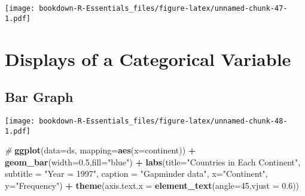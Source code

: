 \documentclass[]{book}
\newenvironment{Shaded}{\begin{snugshade}}{\end{snugshade}}
\newcommand{\KeywordTok}[1]{\textcolor[rgb]{0.13,0.29,0.53}{\textbf{#1}}}
\newcommand{\DataTypeTok}[1]{\textcolor[rgb]{0.13,0.29,0.53}{#1}}
\newcommand{\DecValTok}[1]{\textcolor[rgb]{0.00,0.00,0.81}{#1}}
\newcommand{\FloatTok}[1]{\textcolor[rgb]{0.00,0.00,0.81}{#1}}
\newcommand{\StringTok}[1]{\textcolor[rgb]{0.31,0.60,0.02}{#1}}
\newcommand{\CommentTok}[1]{\textcolor[rgb]{0.56,0.35,0.01}{\textit{#1}}}
\newcommand{\OperatorTok}[1]{\textcolor[rgb]{0.81,0.36,0.00}{\textbf{#1}}}
\newcommand{\NormalTok}[1]{#1}
\begin{document}
\texttt{[image: bookdown-R-Essentials\_files/figure-latex/unnamed-chunk-47-1.pdf]}

\section{Displays of a Categorical
Variable}\label{displays-of-a-categorical-variable}

\subsection{Bar Graph}\label{bar-graph}

\begin{Shaded}
\end{Shaded}

\texttt{[image: bookdown-R-Essentials\_files/figure-latex/unnamed-chunk-48-1.pdf]}

\begin{Shaded}
\begin{Highlighting}[]
\CommentTok{#}
\KeywordTok{ggplot}\NormalTok{(}\DataTypeTok{data=}\NormalTok{ds, }\DataTypeTok{mapping=}\KeywordTok{aes}\NormalTok{(}\DataTypeTok{x=}\NormalTok{continent)) }\OperatorTok{+}\StringTok{ }
\StringTok{  }\KeywordTok{geom_bar}\NormalTok{(}\DataTypeTok{width=}\FloatTok{0.5}\NormalTok{,}\DataTypeTok{fill=}\StringTok{"blue"}\NormalTok{) }\OperatorTok{+}
\StringTok{  }\KeywordTok{labs}\NormalTok{(}\DataTypeTok{title=}\StringTok{"Countries in Each Continent"}\NormalTok{,}
       \DataTypeTok{subtitle =} \StringTok{"Year = 1997"}\NormalTok{,}
       \DataTypeTok{caption =} \StringTok{"Gapminder data"}\NormalTok{,}
       \DataTypeTok{x=}\StringTok{"Continent"}\NormalTok{, }
       \DataTypeTok{y=}\StringTok{"Frequency"}\NormalTok{) }\OperatorTok{+}
\StringTok{  }\KeywordTok{theme}\NormalTok{(}\DataTypeTok{axis.text.x =} \KeywordTok{element_text}\NormalTok{(}\DataTypeTok{angle=}\DecValTok{45}\NormalTok{,}\DataTypeTok{vjust =} \FloatTok{0.6}\NormalTok{))}
\end{Highlighting}
\end{Shaded}
\end{document}
